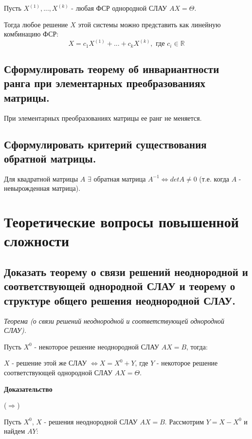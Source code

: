 Пусть $X^{(1)}, ..., X^{(k)}$ - любая ФСР однородной СЛАУ $AX = \Theta.$

Тогда любое решение $X$ этой системы можно представить как линейную комбинацию ФСР:$$X = c_1X^{(1)}+ ...+ c_kX^{(k)}, \text{ где } c_i\in\mathbb{R}$$

\subsection{Сформулировать теорему об инвариантности ранга при элементарных преобразованиях матрицы.}

При элементарных преобразованиях матрицы ее ранг не меняется.

\subsection{Сформулировать критерий существования обратной матрицы.}

Для квадратной матрицы $A$ $\exists$ обратная матрица $A^{-1} \iff detA \ne 0$
(т.е. когда $A$ - невырожденная матрица). 

\newpage\section{Теоретические вопросы повышенной сложности}

\subsection{Доказать теорему о связи решений неоднородной и соответствующей однородной СЛАУ и теорему о структуре общего решения неоднородной СЛАУ.}

\textit {Теорема (о связи решений неоднородной и соответствующей однородной СЛАУ).}

\vspace*{15pt}

Пусть $X^0$ - некоторое решение неоднородной СЛАУ $AX = B$, тогда:

$X$ - решение этой же СЛАУ $\iff X = X^0 + Y$, где $Y$ - некоторое решение соответствующей однородной СЛАУ $AX = \Theta$.

\vspace*{15pt}

{\bf {Доказательство}}

($\Rightarrow$)  

Пусть $X^0$, $X$ - решения неоднородной СЛАУ $AX = B$. Рассмотрим $Y = X - X^0$ и найдем $AY$:

